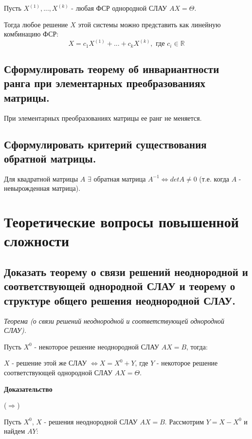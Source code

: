 Пусть $X^{(1)}, ..., X^{(k)}$ - любая ФСР однородной СЛАУ $AX = \Theta.$

Тогда любое решение $X$ этой системы можно представить как линейную комбинацию ФСР:$$X = c_1X^{(1)}+ ...+ c_kX^{(k)}, \text{ где } c_i\in\mathbb{R}$$

\subsection{Сформулировать теорему об инвариантности ранга при элементарных преобразованиях матрицы.}

При элементарных преобразованиях матрицы ее ранг не меняется.

\subsection{Сформулировать критерий существования обратной матрицы.}

Для квадратной матрицы $A$ $\exists$ обратная матрица $A^{-1} \iff detA \ne 0$
(т.е. когда $A$ - невырожденная матрица). 

\newpage\section{Теоретические вопросы повышенной сложности}

\subsection{Доказать теорему о связи решений неоднородной и соответствующей однородной СЛАУ и теорему о структуре общего решения неоднородной СЛАУ.}

\textit {Теорема (о связи решений неоднородной и соответствующей однородной СЛАУ).}

\vspace*{15pt}

Пусть $X^0$ - некоторое решение неоднородной СЛАУ $AX = B$, тогда:

$X$ - решение этой же СЛАУ $\iff X = X^0 + Y$, где $Y$ - некоторое решение соответствующей однородной СЛАУ $AX = \Theta$.

\vspace*{15pt}

{\bf {Доказательство}}

($\Rightarrow$)  

Пусть $X^0$, $X$ - решения неоднородной СЛАУ $AX = B$. Рассмотрим $Y = X - X^0$ и найдем $AY$:

